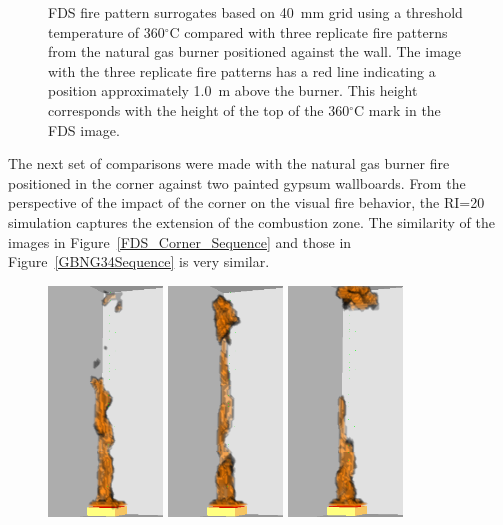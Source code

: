 \documentclass[twoside]{uocthesis}
\begin{document}
{\begin{figure}[h]
  \caption[FDS fire pattern surrogates based on 40~mm grid using a threshold temperature of 350$^\circ$C compared with three replicate fire patterns from the natural gas burner positioned against the wall]{FDS fire pattern surrogates based on 40~mm grid using a threshold temperature of 360$^\circ$C compared with three replicate fire patterns from the natural gas burner positioned against the wall.  The image with the three replicate fire patterns has a red line indicating a position approximately 1.0~m above the burner.  This height corresponds with the height of the top of the 360$^\circ$C mark in the FDS image.}
  \label{FDS_FirePattern_comp}
\end{figure}

The next set of comparisons were made with the natural gas burner fire positioned in the corner against two painted gypsum wallboards. From the perspective of the impact of the corner on the visual fire behavior, the RI=20 simulation captures the extension of the combustion zone.  The similarity of the images in Figure~\ref{FDS_Corner_Sequence} and those in Figure~\ref{GBNG34Sequence} is very similar.     

\begin{figure}[p]
	\includegraphics[width=1.2in]{../Figures/FDSNG_Corner1}
	\includegraphics[width=1.2in]{../Figures/FDSNG_Corner2}
	\includegraphics[width=1.2in]{../Figures/FDSNG_Corner3} \\


\end{figure}}
\end{document}
